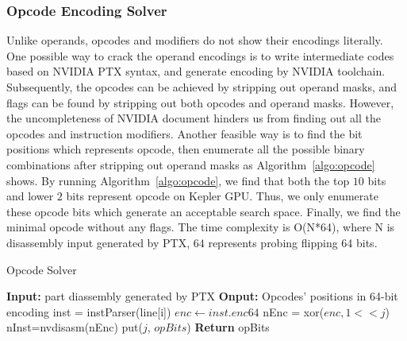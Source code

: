 \subsubsection{Opcode Encoding Solver}
Unlike operands, opcodes and modifiers do not show their encodings literally. One possible way to crack the operand 
encodings is to write intermediate codes
based on NVIDIA PTX syntax, and generate encoding by NVIDIA toolchain.
Subsequently, the opcodes can be achieved by stripping out operand masks, and
flags can be found by stripping out both opcodes and operand masks.
However, the uncompleteness of NVIDIA document hinders us from finding out all the opcodes and instruction modifiers. 
Another feasible way is to find the bit positions which represents opcode, then
enumerate all the possible binary combinations after stripping out operand masks as Algorithm~\ref{algo:opcode} shows.
By running Algorithm~\ref{algo:opcode}, we find that both the top $10$ bits and lower $2$ bits represent opcode on Kepler GPU.
Thus, we only enumerate these opcode bits which generate an acceptable search space. Finally, we find 
the minimal opcode without any flags. The time complexity is O(N*64), where N
is disassembly input generated by PTX, $64$ represents probing flipping 64
bits.

\begin{algorithm}[htbp]
      \caption{Opcode Solver}\label{algo:opcode}
  \begin{algorithmic}[1]
      \State \textbf {Input:} part diassembly generated by PTX
      \State \textbf {Onput:} Opcodes' positions in 64-bit encoding
      \State inst = instParser(line[i])
      \State $enc \gets inst.enc64$
      \State nEnc = xor($enc, 1<<j$)
      \State nInst=nvdisasm(nEnc)
      \State put($j$, $opBits$)
      \EndIf
      \EndFor
      \EndFor
      \State \textbf{Return} opBits %
  \end{algorithmic}
\end{algorithm}

